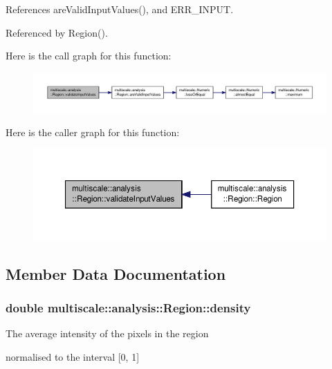 References are\-Valid\-Input\-Values(), and E\-R\-R\-\_\-\-I\-N\-P\-U\-T.



Referenced by Region().



Here is the call graph for this function\-:\nopagebreak
\begin{figure}[H]
\begin{center}
\leavevmode
\includegraphics[width=350pt]{classmultiscale_1_1analysis_1_1Region_a517b46fd89696f44086aafb1a9526995_cgraph}
\end{center}
\end{figure}




Here is the caller graph for this function\-:\nopagebreak
\begin{figure}[H]
\begin{center}
\leavevmode
\includegraphics[width=350pt]{classmultiscale_1_1analysis_1_1Region_a517b46fd89696f44086aafb1a9526995_icgraph}
\end{center}
\end{figure}




\subsection{Member Data Documentation}
\hypertarget{classmultiscale_1_1analysis_1_1Region_af4eb62fddbe850271dfe15bb240b13bb}{
\subsubsection[{density}]{\setlength{\rightskip}{0pt plus 5cm}double multiscale\-::analysis\-::\-Region\-::density\hspace{0.3cm}{\ttfamily [private]}}}\label{classmultiscale_1_1analysis_1_1Region_af4eb62fddbe850271dfe15bb240b13bb}
\begin{DoxyVerb}             The average intensity of the pixels in the region
\end{DoxyVerb}
 normalised to the interval \mbox{[}0, 1\mbox{]} 

